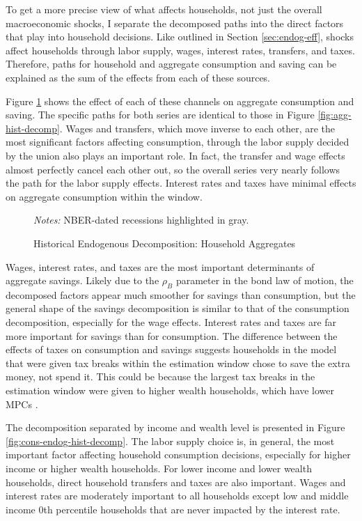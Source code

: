 To get a more precise view of what affects households, not just the overall macroeconomic shocks, I separate the decomposed paths into the direct factors that play into household decisions. Like outlined in Section \ref{sec:endog-eff}, shocks affect households through labor supply, wages, interest rates, transfers, and taxes. Therefore, paths for household and aggregate consumption and saving can be explained as the sum of the effects from each of these sources.

Figure \ref{fig:agg-endog-hist-decomp} shows the effect of each of these channels on aggregate consumption and saving. The specific paths for both series are identical to those in Figure \ref{fig:agg-hist-decomp}. Wages and transfers, which move inverse to each other, are the most significant factors affecting consumption, through the labor supply decided by the union also plays an important role. In fact, the transfer and wage effects almost perfectly cancel each other out, so the overall series very nearly follows the path for the labor supply effects. Interest rates and taxes have minimal effects on aggregate consumption within the window.

\begin{figure}[t]
    \centering
    \caption{Historical Endogenous Decomposition: Household Aggregates}
    

    {\scriptsize \emph{Notes:} NBER-dated recessions highlighted in gray.}
    \label{fig:agg-endog-hist-decomp}
\end{figure}

Wages, interest rates, and taxes are the most important determinants of aggregate savings. Likely due to the $\rho_B$ parameter in the bond law of motion, the decomposed factors appear much smoother for savings than consumption, but the general shape of the savings decomposition is similar to that of the consumption decomposition, especially for the wage effects. Interest rates and taxes are far more important for savings than for consumption. The difference between the effects of taxes on consumption and savings suggests households in the model that were given tax breaks within the estimation window chose to save the extra money, not spend it. This could be because the largest tax breaks in the estimation window were given to higher wealth households, which have lower MPCs \autocite{auclert2023mpcs}.

The decomposition separated by income and wealth level is presented in Figure \ref{fig:cons-endog-hist-decomp}. The labor supply choice is, in general, the most important factor affecting household consumption decisions, especially for higher income or higher wealth households. For lower income and lower wealth households, direct household transfers and taxes are also important. Wages and interest rates are moderately important to all households except low and middle income 0th percentile households that are never impacted by the interest rate.

